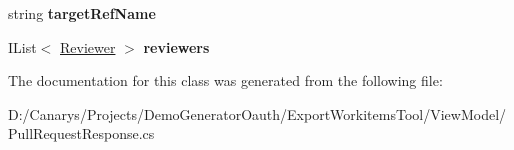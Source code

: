 \begin{DoxyCompactItemize}
\mbox{\label{class_templates_generator_tool_1_1_view_model_1_1_pull_request_response_1_1_value_af7cf60ef93420fde50de2bee472d9375}} 
string {\bfseries target\+Ref\+Name}
\item 
\mbox{\label{class_templates_generator_tool_1_1_view_model_1_1_pull_request_response_1_1_value_a48bf30eb3d4e26ecfd01770cb5ad890e}} 
I\+List$<$ \mbox{\hyperlink{class_templates_generator_tool_1_1_view_model_1_1_pull_request_response_1_1_reviewer}{Reviewer}} $>$ {\bfseries reviewers}
\end{DoxyCompactItemize}


The documentation for this class was generated from the following file\+:\begin{DoxyCompactItemize}
\item 
D\+:/\+Canarys/\+Projects/\+Demo\+Generator\+Oauth/\+Export\+Workitems\+Tool/\+View\+Model/Pull\+Request\+Response.\+cs\end{DoxyCompactItemize}

